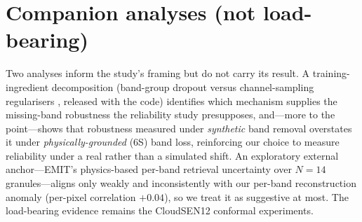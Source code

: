 \documentclass[preprint,3p,times]{elsarticle}
\begin{document}
\section{Companion analyses (not load-bearing)}
\label{app:companion}
Two analyses inform the study's framing but do not carry its result. A training-ingredient decomposition (band-group dropout versus channel-sampling regularisers \citep{bao2024channelvit,pham2024dichavit}, released with the code) identifies which mechanism supplies the missing-band robustness the reliability study presupposes, and---more to the point---shows that robustness measured under \emph{synthetic} band removal overstates it under \emph{physically-grounded} (6S) band loss, reinforcing our choice to measure reliability under a real rather than a simulated shift. An exploratory external anchor---EMIT's physics-based per-band retrieval uncertainty \citep{green2020emit,thompson2018isofit} over $N=14$ granules---aligns only weakly and inconsistently with our per-band reconstruction anomaly (per-pixel correlation $+0.04$), so we treat it as suggestive at most. The load-bearing evidence remains the CloudSEN12 conformal experiments.



\end{document}
